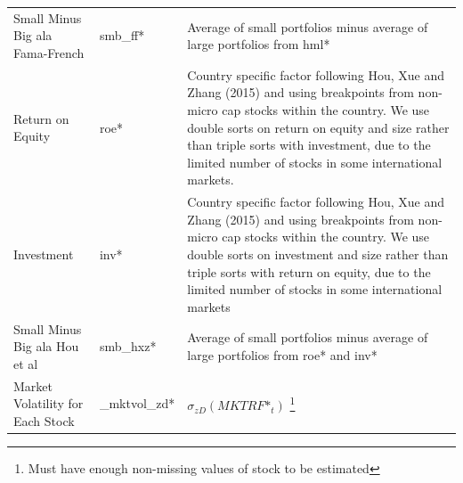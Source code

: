 \documentclass[12pt,title,fleqn]{article}
\begin{document}
{\begin{longtable}{@{\extracolsep{\fill}}|m{5cm}|l|m{8cm}|@{}}
	Small Minus Big ala Fama-French & smb\_ff\mbox{*} & Average of small portfolios minus average of large portfolios from  hml\mbox{*} \\
		
	Return on Equity & roe\mbox{*} & Country specific factor following Hou, Xue and Zhang (2015) and using breakpoints from non-micro cap stocks within the country. We use double sorts on return on equity and size rather than triple sorts with investment, due to the limited number of stocks in some international markets. \\
		
	Investment & inv\mbox{*} & Country specific factor following Hou, Xue and Zhang (2015) and using breakpoints from non-micro cap stocks within the country. We use double sorts on investment and size rather than triple sorts with return on equity, due to the limited number of stocks in some international markets\\
	
	Small Minus Big ala Hou et al & smb\_hxz\mbox{*} & Average of small portfolios minus average of large portfolios from roe\mbox{*} and inv\mbox{*}\\
		
	Market Volatility for Each Stock & \_mktvol\_zd\mbox{*} & 
	    $\sigma_{zD}(MKTRF\mbox{*}_t)$ \footnote{Must have enough non-missing values of stock to be estimated} \\

\end{longtable}
}
\end{document}

